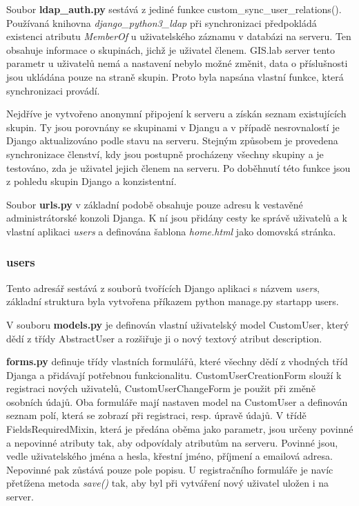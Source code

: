Soubor \textbf{ldap\_auth.py} sestává z jediné funkce
\textsf{custom\_sync\_user\_relations()}. Používaná knihovna
\textit{django\_python3\_ldap} při synchronizaci předpokládá existenci
atributu \textit{MemberOf} u uživatelského záznamu v databázi na
 serveru. Ten obsahuje informace o skupinách, jichž je
uživatel členem. GIS.lab server tento parametr u uživatelů nemá a
nastavení nebylo možné změnit, data o příslušnosti jsou ukládána pouze
na straně skupin. Proto byla napsána vlastní funkce, která
synchronizaci provádí.

Nejdříve je vytvořeno anonymní připojení k  serveru a získán
seznam existujících skupin. Ty jsou porovnány se skupinami v Djangu a
v případě nesrovnalostí je Django aktualizováno podle stavu na
 serveru. Stejným způsobem je provedena synchronizace
členství, kdy jsou postupně procházeny všechny skupiny a je testováno,
zda je uživatel jejich členem na  serveru. Po doběhnutí této
funkce jsou z pohledu skupin Django a  konzistentní.

Soubor \textbf{urls.py} v základní podobě obsahuje pouze 
adresu k vestavěné administrátorské konzoli Djanga. K ní jsou přidány
cesty ke správě uživatelů a k vlastní aplikaci \textit{users} a
definována šablona \textit{home.html} jako domovská stránka.

\subsubsection{users}

Tento adresář sestává z souborů tvořících Django aplikaci s názvem
\textit{users}, základní struktura byla vytvořena příkazem
\textsf{python manage.py startapp users}.

V souboru \textbf{models.py} je definován vlastní uživatelský model
\textsf{CustomUser}, který dědí z třídy \textsf{AbstractUser} a
rozšiřuje ji o nový textový atribut \textsf{description}.

\textbf{forms.py} definuje třídy vlastních formulářů, které všechny
dědí z vhodných tříd Djanga a přidávají potřebnou
funkcionalitu. \textsf{CustomUserCreationForm} slouží k registraci
nových uživatelů, \textsf{CustomUserChangeForm} je použit při změně
osobních údajů. Oba formuláře mají nastaven model na
\textsf{CustomUser} a definován seznam polí, která se zobrazí při
registraci, resp. úpravě údajů. V třídě \textsf{FieldsRequiredMixin},
která je předána oběma jako parametr, jsou určeny povinné a nepovinné
atributy tak, aby odpovídaly atributům na  serveru. Povinné
jsou, vedle uživatelského jména a hesla, křestní jméno, příjmení a
emailová adresa. Nepovinné pak zůstává pouze pole popisu. U
registračního formuláře je navíc přetížena metoda \textit{save()} tak,
aby byl při vytváření nový uživatel uložen i na  server.

